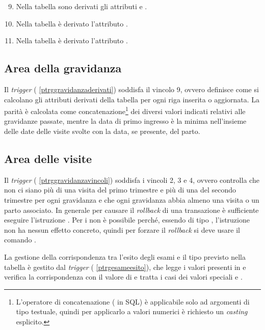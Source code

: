\begin{enumerate}
\setcounter{enumi}{8}
\item Nella tabella  sono derivati gli attributi  e .
\item Nella tabella  è derivato l'attributo .
\item Nella tabella  è derivato l'attributo .
\end{enumerate}

\subsection{Area della gravidanza}
\label{triggerspregnancy}

Il \emph{trigger}  (\lstlistingname{} \ref{ptrggravidanzaderivati}) soddisfa il vincolo 9, ovvero definisce come si calcolano gli attributi derivati della tabella  per ogni riga inserita o aggiornata.
La parità è calcolata come concatenazione\footnote{
  L'operatore di concatenazione (\sql{||} in SQL) è applicabile solo ad argomenti di tipo testuale, quindi per applicarlo a valori numerici è richiesto un \emph{casting} esplicito.
} dei diversi valori indicati relativi alle gravidanze passate, mentre la data di primo ingresso è la minima nell'insieme delle date delle visite svolte con la data, se presente, del parto.

\subsection{Area delle visite}
\label{triggersvisits}

Il \emph{trigger}  (\lstlistingname{} \ref{ptrggravidanzavincoli}) soddisfa i vincoli 2, 3 e 4, ovvero controlla che non ci siano più di una visita del primo trimestre e più di una del secondo trimestre per ogni gravidanza e che ogni gravidanza abbia almeno una visita o un parto associato.
In generale per causare il \emph{rollback} di una transazione è sufficiente eseguire l'istruzione .
Per i  non è possibile perché, essendo di tipo , l'istruzione  non ha nessun effetto concreto, quindi per forzare il \emph{rollback} si deve usare il comando .

La gestione della corrispondenza tra l'esito degli esami e il tipo previsto nella tabella  è gestito dal \emph{trigger}  (\lstlistingname{} \ref{ptrgesameesito}), che legge i valori presenti in  e verifica la corrispondenza con il valore  di  e tratta i casi dei valori speciali  e .


